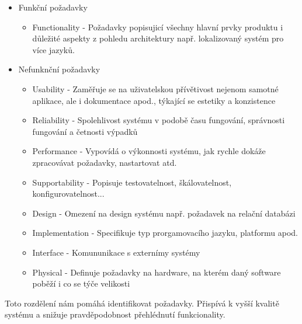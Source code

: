 	\begin{itemize}
		\item Funkční požadavky
			\begin{itemize}
				\item Functionality - Požadavky popisujicí všechny hlavní prvky produktu i důležité aspekty z pohledu architektury např. lokalizovaný systém pro více jazyků.
			\end{itemize}
		\item Nefunknční požadavky
			\begin{itemize}
				\item Usability - Zaměřuje se na uživatelskou přívětivost nejenom samotné aplikace, ale i dokumentace apod., týkající se estetiky a konzistence
				\item Reliability - Spolehlivost systému v podobě času fungování, správnosti fungování a četnosti výpadků
				\item Performance - Vypovídá o výkonnosti systému, jak rychle dokáže zpracovávat požadavky, nastartovat atd.
				\item Supportability - Popisuje testovatelnost, škálovatelnost, konfigurovatelnost...
				\item Design - Omezení na design systému např. požadavek na relační databázi
				\item Implementation - Specifikuje typ prorgamovacího jazyku, platformu apod.
				\item Interface - Komununikace s externímy systémy
				\item Physical - Definuje požadavky na hardware, na kterém daný software poběží i co se týče velikosti
			\end{itemize}
	\end{itemize}
	
	Toto rozdělení nám pomáhá identifikovat požadavky. Přispívá k vyšší kvalitě systému a snižuje pravděpodobnost přehlédnutí funkcionality.